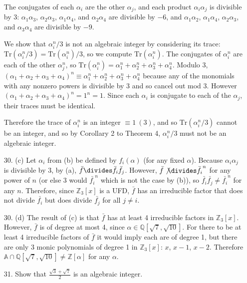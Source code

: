 \documentclass{article}
\newcommand{\Q}[0]{\mathbb{Q}}
\newcommand{\Z}[0]{\mathbb{Z}}
\newcommand{\trace}[1]{\text{Tr}(#1)}
\begin{document}
\begin{enumerate}
The conjugates of each $\alpha_i$ are the other $\alpha_j$, and each product $\alpha_i \alpha_j$ is divisible by 3: $\alpha_1 \alpha_3$, $\alpha_2 \alpha_3$, $\alpha_1 \alpha_4$, and $\alpha_2 \alpha_4$ are divisible by $-6$, and $\alpha_1 \alpha_2$, $\alpha_1 \alpha_4$, $\alpha_2 \alpha_3$, and $\alpha_3 \alpha_4$ are divisible by $-9$.

We show that $\alpha_i^n / 3$ is not an algebraic integer by considering its trace: $\trace{\alpha_i^n / 3} = \trace{\alpha_i^n} / 3$, so we compute $\trace{\alpha_i^n}$.  The conjugates of $\alpha_i^n$ are each of the other $\alpha_j^n$, so $\trace{\alpha_i^n} = \alpha_1^n + \alpha_2^n + \alpha_3^n + \alpha_4^n$.  Modulo 3, $(\alpha_1 + \alpha_2 + \alpha_3 + \alpha_4)^n \equiv \alpha_1^n + \alpha_2^n + \alpha_3^n + \alpha_4^n$ because any of the monomials with any nonzero powers is divisible by 3 and so cancel out mod 3.  However $(\alpha_1 + \alpha_2 + \alpha_3 + \alpha_4)^n = 1^n = 1$.  Since each $\alpha_i$ is conjugate to each of the $\alpha_j$, their traces must be identical.

Therefore the trace of $\alpha_i^n$ is an integer $\equiv 1\ (3)$, and so $\trace{\alpha_i^n / 3}$ cannot be an integer, and so by Corollary 2 to Theorem 4, $\alpha_i^n / 3$ must not be an algebraic integer.

\item[30. (c)] Let $\alpha_i$ from (b) be defined by $f_i(\alpha)$ (for any fixed $\alpha$).  Because $\alpha_i \alpha_j$ is divisible by 3, by (a), $\bar{f} \divides \bar{f_i}\bar{f_j}$.  However, $\bar{f} \not \divides \bar{f_i}^n$ for any power of $n$ (or else 3 would $\bar{f_i}^n$ which is not the case by (b)), so $\bar{f_i}\bar{f_j} \ne \bar{f_i}^n$ for any $n$.  Therefore, since $\Z_3[x]$ is a UFD, $\bar{f}$ has an irreducible factor that does not divide $\bar{f_i}$ but does divide $\bar{f_j}$ for all $j \neq i$.

\item[30. (d)] The result of (c) is that $\bar{f}$ has at least 4 irreducible factors in $\Z_3[x]$.  However, $\bar{f}$ is of degree at most 4, since $\alpha \in \Q[\sqrt{7}, \sqrt{10}]$.  For there to be at least 4 irreducible factors of $\bar{f}$ it would imply each are of degree 1, but there are only 3 monic polynomials of degree 1 in $\Z_3[x]$: $x$, $x - 1$, $x - 2$.  Therefore $\mathbb{A} \cap \Q[\sqrt{7}, \sqrt{10}] \neq \Z[\alpha]$ for any $\alpha$.

\item[31.] Show that $\frac{\sqrt{3} + \sqrt{7}}{2}$ is an algebraic integer.


\end{enumerate}
\end{document}
